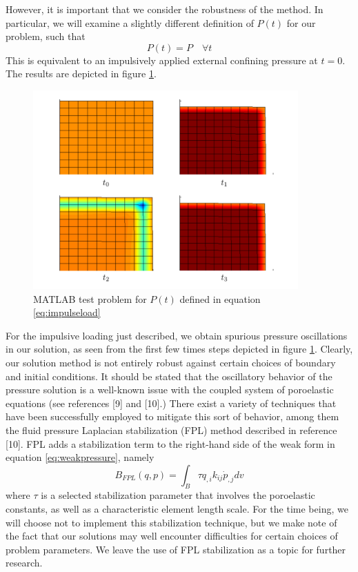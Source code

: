\documentclass[11pt]{article} %
\begin{document}
However, it is important that we consider the robustness of the method. In particular, we will examine a slightly different definition of $P(t)$ for our problem, such that
\begin{equation}
	P(t) = P \quad \forall t
	\label{eq:impulseload}
\end{equation}
This is equivalent to an impulsively applied external confining pressure at $t = 0$. The results are depicted in figure \ref{fig:impulsetest}.
\begin{figure} [!ht]
	\centering
	\includegraphics[width = 4.0in,trim=70 20 70 20,clip=true]{impulsetest.pdf}
	\caption{MATLAB test problem for $P(t)$ defined in equation \ref{eq:impulseload}}
	\label{fig:impulsetest}
\end{figure}

For the impulsive loading just described, we obtain spurious pressure oscillations in our solution, as seen from the first few times steps depicted in figure \ref{fig:impulsetest}. Clearly, our solution method is not entirely robust against certain choices of boundary and initial conditions. It should be stated that the oscillatory behavior of the pressure solution is a well-known issue with the coupled system of poroelastic equations (see references [9] and [10].) There exist a variety of techniques that have been successfully employed to mitigate this sort of behavior, among them the fluid pressure Laplacian stabilization (FPL) method described in reference [10]. FPL adds a stabilization term to the right-hand side of the weak form in equation \ref{eq:weakpressure}, namely
\begin{equation}
	B_{FPL} (q,p) = \int_B \tau q_{,i} k_{ij} \dot{p}_{,j} dv
\end{equation}
where $\tau$ is a selected stabilization parameter that involves the poroelastic constants, as well as a characteristic element length scale. For the time being, we will choose not to implement this stabilization technique, but we make note of the fact that our solutions may well encounter difficulties for certain choices of problem parameters. We leave the use of FPL stabilization as a topic for further research.
\end{document}
